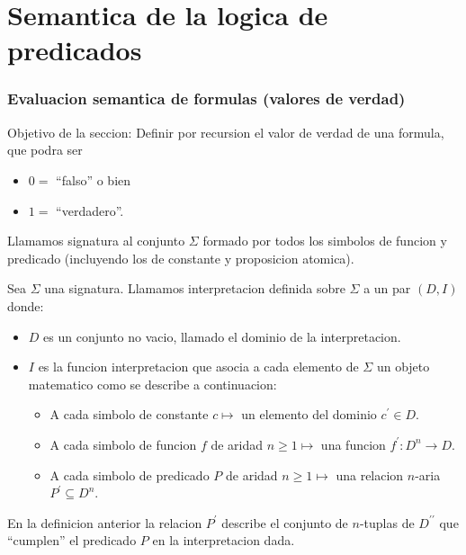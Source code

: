 \part{Semantica de la logica de predicados}

\section{Evaluacion semantica de formulas (valores de verdad)}
Objetivo de la seccion: Definir por recursion el valor de verdad de una formula, que podra ser
\begin{itemize}
	\item \(0 = \) ``falso'' o bien
	\item \(1 = \) ``verdadero''.
\end{itemize}

\begin{definition}[Signatura]
	Llamamos signatura al conjunto \(\Sigma \) formado por todos los simbolos de funcion y predicado (incluyendo los de constante y proposicion atomica).
\end{definition}

\begin{definition}[Interpretacion]
	Sea \(\Sigma \) una signatura. Llamamos interpretacion definida sobre \(\Sigma \) a un par \((D,I )\) donde:
	\begin{itemize}
		\item \(D \) es un conjunto no vacio, llamado el dominio de la interpretacion.
		\item \(I \) es la funcion interpretacion que asocia a cada elemento de \(\Sigma \) un objeto matematico como se describe a continuacion:
		      \begin{itemize}
			      \item A cada simbolo de constante \(c \mapsto \) un elemento del dominio \(c^\prime \in D \).
			      \item A cada simbolo de funcion \(f \) de aridad \(n \geq 1 \mapsto\) una funcion \(f^\prime: D^{n}\to D \).
			      \item A cada simbolo de predicado \(P \) de aridad \(n \geq  1 \mapsto\) una relacion \(n \)-aria \(P^\prime \subseteq D^{n } \).
		      \end{itemize}
	\end{itemize}
\end{definition}

\begin{remark}
	En la definicion anterior la relacion \(P^\prime  \) describe el conjunto de \(n \)-tuplas de \(D^{\prime\prime} \) que ``cumplen'' el predicado \(P \) en la interpretacion dada.
\end{remark}

